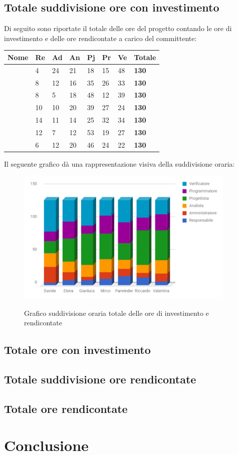 \documentclass[PianoDiProgetto.tex]{subfiles}
\begin{document}
\subsection{Totale suddivisione ore con investimento}
Di seguito sono riportate il totale delle ore del progetto contando le ore di investimento e delle ore rendicontate a carico del committente:
\begin{center}
\begin{table}[htbp]
	\centering
	\renewcommand\arraystretch{1.5}
	\begin{tabularx}{\textwidth}{p{4cm}|p{1cm}|p{1cm}|p{1cm}|p{1cm}|p{1cm}|p{1cm}|p{2cm}}
		\hline
		\textbf{Nome} & \textbf{Re} & \textbf{Ad} & \textbf{An} & \textbf{Pj} & \textbf{Pr} & \textbf{Ve} & \textbf{Totale} \\
		\hline
		\Davide & 4 & 24 & 21 & 18 & 15 & 48 & \textbf{130} \\
		\hline
		\Elena & 8 & 12 & 16 & 35 & 26 & 33 & \textbf{130} \\
		\hline
		\Gianluca & 8 & 5 & 18 & 48 & 12 & 39 & \textbf{130} \\
		\hline
		\Mirco & 10 & 10 & 20 & 39 & 27 & 24 & \textbf{130} \\
		\hline
		\Parwinder & 14 & 11 & 14 & 25 & 32 & 34 & \textbf{130} \\
		\hline
		\Riccardo & 12 & 7 & 12 & 53 & 19 & 27 & \textbf{130} \\
		\hline
		\Valentina & 6 & 12 & 20 & 46 & 24 & 22 & \textbf{130} \\
		\hline
	\end{tabularx}
\end{table}
\end{center}
Il seguente grafico dà una rappresentazione visiva della suddivisione oraria:\\
\begin{figure}[h]
	\includegraphics[width=10.5cm]{images/prospettoOrario/totale.png}
	\label{fig:foo}
	\caption{Grafico suddivisione oraria totale delle ore di investimento e rendicontate}
\end{figure} 
\newpage
\subsection{Totale ore con investimento}
\subsection{Totale suddivisione ore rendicontate}
\subsection{Totale ore rendicontate}

\section{Conclusione}
\end{document}
